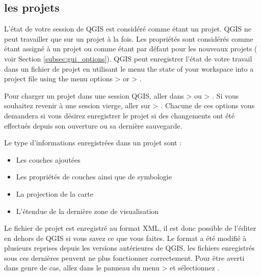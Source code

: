 \subsection{les projets}\label{sec:projects}

L'\'etat de votre session de QGIS est consid\'er\'e comme \'etant un projet. QGIS ne peut travailler que sur un projet \`a la fois. Les propri\'et\'es sont consid\'er\'es comme \'etant assign\'e \`a un projet ou comme \'etant par d\'efaut pour les nouveaux projets ( voir Section \ref{subsec:gui_options}). QGIS peut enregistrer l'\'etat de votre travail dans un fichier de projet en utilisant le menu the state of your 
workspace into a project file using the menu options 
 > 
or  > .

Pour charger un projet dans une session QGIS, aller dans  >  ou  > . Si vous souhaitez revenir \`a une session vierge, aller sur  > .
Chacune de ces options vous demandera si vous d\'esirez enregistrer le projet si des changements ont \'et\'e effectu\'es depuis son ouverture ou sa derni\`ere sauvegarde.

Le type d'informations enregistr\'ees dans un projet sont :

\begin{itemize}
\item Les couches ajout\'ees
\item Les propri\'et\'es de couches ainsi que de symbologie
\item La projection de la carte
\item L'\'etendue de la derni\`ere zone de visualisation
\end{itemize}
%


Le fichier de projet est enregistr\'e au format XML, il est donc possible de l'\'editer en dehors de QGIS si vous savez ce que vous faites. Le format a \'et\'e modifi\'e \`a plusieurs reprises depuis les versions ant\'erieures de QGIS, les fichiers enregistr\'es sous ces derni\`eres peuvent ne plus fonctionner correctement. Pour \^etre averti dans genre de cas, allez dans le panneau  du menu  >  
et s\'electionnez .

